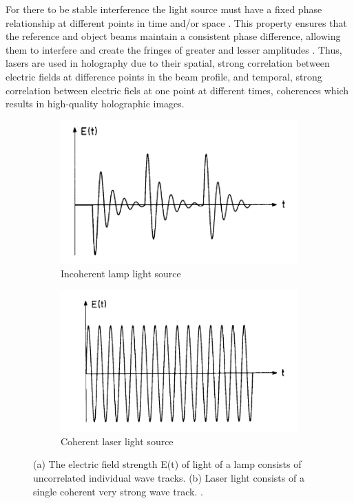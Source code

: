 \documentclass[12pt]{article}
\begin{document}
For there to be stable interference the light source must have a fixed phase relationship at different points in time and/or space \cite{wolf2007introduction}.
This property ensures that the reference and object beams maintain a consistent phase difference, allowing them to interfere and create the fringes of greater and lesser amplitudes
\cite{Born_Wolf_Bhatia_Clemmow_Gabor_Stokes_Taylor_Wayman_Wilcock_1999}.
Thus, lasers are used in holography due to their spatial, strong correlation between electric fields at difference points in the beam profile, and temporal, strong correlation between electric fiels at one point at different times, coherences
\cite{Paschotta_2007_coherence} which results in high-quality holographic images.

\begin{figure}[H]
    \centering
    \begin{subfigure}[b]{.45\textwidth}
        \centering
        \includegraphics[width=\linewidth]{incoherent source.png}
        \caption{\centering Incoherent lamp light source}
        \label{fig:5a}
    \end{subfigure}
    \hspace{-.5em}
    \begin{subfigure}[b]{.45\textwidth}
        \centering
        \includegraphics[width=\linewidth]{coherent source.png}
        \caption{\centering Coherent laser light source}
        \label{fig:5b}
    \end{subfigure}
    \caption{(a) The electric field strength E(t) of light of a lamp consists of uncorrelated individual wave tracks.
    (b) Laser light consists of a single coherent very strong wave track. \protect\cite{haken1986laser}.}
    \label{fig:5}
\end{figure}
\end{document}
